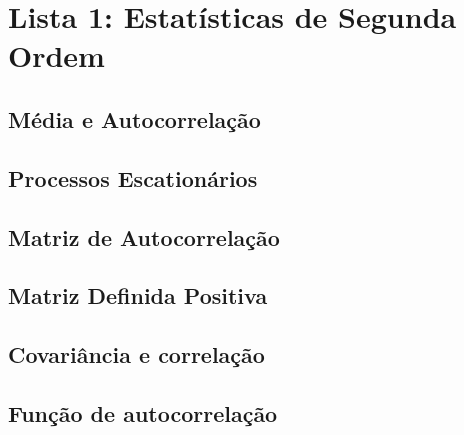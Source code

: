 \section{Lista 1: Estatísticas de Segunda Ordem}

\subsection{Média e Autocorrelação}

\subsection{Processos Escationários}

\subsection{Matriz de Autocorrelação}

\subsection{Matriz Definida Positiva}

\subsection{Covariância e correlação}

\subsection{Função de autocorrelação}